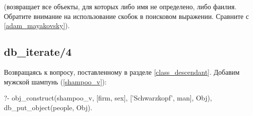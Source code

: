 \documentclass[a4paper]{book}
\begin{document}
(возвращает все объекты, для которых либо имя не определено, либо
фаилия. Обратите внимание на использование скобок в поисковом
выражении. Сравните с \ref{adam_mayakovsky}).

\subsection{db\_iterate/4}

Возвращаясь к вопросу, поставленному в разделе
\ref{class_descendant}. Добавим мужской шампунь (\ref{shampoo_v}):

\begin{example}{}{}
?- obj_construct(shampoo_v, [firm, sex], 
                 ['Schwarzkopf', man], Obj),
    db_put_object(people, Obj).
\end{example}
\end{document}
